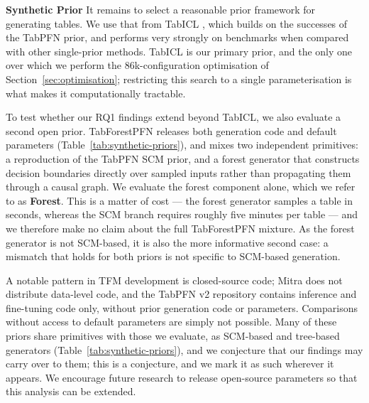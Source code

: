 \documentclass{article}
\begin{document}
\textbf{Synthetic Prior} It remains to select a reasonable prior framework for generating tables.
We use that from TabICL \cite{quTabICLTabularFoundation2025}, which builds on the successes of the TabPFN \cite{hollmannAccuratePredictionsSmall2025} prior, and performs very strongly on benchmarks when compared with other single-prior methods.
TabICL is our primary prior, and the only one over which we perform the 86k-configuration optimisation of Section~\ref{sec:optimisation}; restricting this search to a single parameterisation is what makes it computationally tractable.

To test whether our RQ1 findings extend beyond TabICL, we also evaluate a second open prior.
TabForestPFN \cite{breejenFinetunedInContextLearning2025} releases both generation code and default parameters (Table~\ref{tab:synthetic-priors}), and mixes two independent primitives: a reproduction of the TabPFN SCM prior, and a forest generator that constructs decision boundaries directly over sampled inputs rather than propagating them through a causal graph.
We evaluate the forest component alone, which we refer to as \textbf{Forest}.
This is a matter of cost --- the forest generator samples a table in seconds, whereas the SCM branch requires roughly five minutes per table --- and we therefore make no claim about the full TabForestPFN mixture.
As the forest generator is not SCM-based, it is also the more informative second case: a mismatch that holds for both priors is not specific to SCM-based generation.

A notable pattern in TFM development is closed-source code; Mitra \cite{zhangMitraMixedSynthetic2025} does not distribute data-level code, and the TabPFN v2 \cite{hollmannAccuratePredictionsSmall2025} repository contains inference and fine-tuning code only, without prior generation code or parameters.
Comparisons without access to default parameters are simply not possible.
Many of these priors share primitives with those we evaluate, as SCM-based and tree-based generators (Table~\ref{tab:synthetic-priors}), and we conjecture that our findings may carry over to them; this is a conjecture, and we mark it as such wherever it appears.
We encourage future research to release open-source parameters so that this analysis can be extended.
\end{document}
